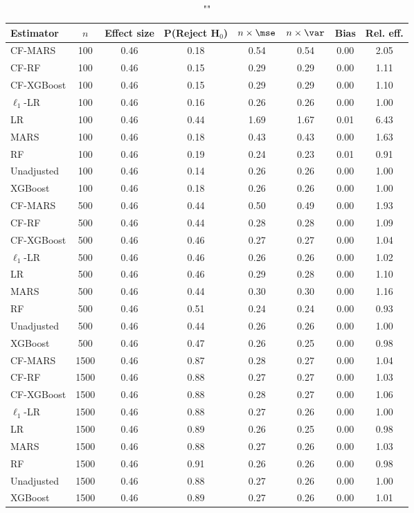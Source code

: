 \begin{table}
\centering
\caption{""}
\begin{tabular}{lccccccc}
\toprule
Estimator & $n$ & Effect size & P(Reject H$_0$) & $n\times\mse$ & $n\times \var$ & Bias & Rel. eff.\\ \midrule
CF-MARS & 100 & 0.46 & 0.18 & 0.54 & 0.54 & 0.00 & 2.05 \\ 
CF-RF & 100 & 0.46 & 0.15 & 0.29 & 0.29 & 0.00 & 1.11 \\ 
CF-XGBoost & 100 & 0.46 & 0.15 & 0.29 & 0.29 & 0.00 & 1.10 \\ 
$\ell_1$-LR & 100 & 0.46 & 0.16 & 0.26 & 0.26 & 0.00 & 1.00 \\ 
LR & 100 & 0.46 & 0.44 & 1.69 & 1.67 & 0.01 & 6.43 \\ 
MARS & 100 & 0.46 & 0.18 & 0.43 & 0.43 & 0.00 & 1.63 \\ 
RF & 100 & 0.46 & 0.19 & 0.24 & 0.23 & 0.01 & 0.91 \\ 
Unadjusted & 100 & 0.46 & 0.14 & 0.26 & 0.26 & 0.00 & 1.00 \\ 
XGBoost & 100 & 0.46 & 0.18 & 0.26 & 0.26 & 0.00 & 1.00 \\ \addlinespace 
CF-MARS & 500 & 0.46 & 0.44 & 0.50 & 0.49 & 0.00 & 1.93 \\ 
CF-RF & 500 & 0.46 & 0.44 & 0.28 & 0.28 & 0.00 & 1.09 \\ 
CF-XGBoost & 500 & 0.46 & 0.46 & 0.27 & 0.27 & 0.00 & 1.04 \\ 
$\ell_1$-LR & 500 & 0.46 & 0.46 & 0.26 & 0.26 & 0.00 & 1.02 \\ 
LR & 500 & 0.46 & 0.46 & 0.29 & 0.28 & 0.00 & 1.10 \\ 
MARS & 500 & 0.46 & 0.44 & 0.30 & 0.30 & 0.00 & 1.16 \\ 
RF & 500 & 0.46 & 0.51 & 0.24 & 0.24 & 0.00 & 0.93 \\ 
Unadjusted & 500 & 0.46 & 0.44 & 0.26 & 0.26 & 0.00 & 1.00 \\ 
XGBoost & 500 & 0.46 & 0.47 & 0.26 & 0.25 & 0.00 & 0.98 \\ \addlinespace 
CF-MARS & 1500 & 0.46 & 0.87 & 0.28 & 0.27 & 0.00 & 1.04 \\ 
CF-RF & 1500 & 0.46 & 0.88 & 0.27 & 0.27 & 0.00 & 1.03 \\ 
CF-XGBoost & 1500 & 0.46 & 0.88 & 0.28 & 0.27 & 0.00 & 1.06 \\ 
$\ell_1$-LR & 1500 & 0.46 & 0.88 & 0.27 & 0.26 & 0.00 & 1.00 \\ 
LR & 1500 & 0.46 & 0.89 & 0.26 & 0.25 & 0.00 & 0.98 \\ 
MARS & 1500 & 0.46 & 0.88 & 0.27 & 0.26 & 0.00 & 1.03 \\ 
RF & 1500 & 0.46 & 0.91 & 0.26 & 0.26 & 0.00 & 0.98 \\ 
Unadjusted & 1500 & 0.46 & 0.88 & 0.27 & 0.26 & 0.00 & 1.00 \\ 
XGBoost & 1500 & 0.46 & 0.89 & 0.27 & 0.26 & 0.00 & 1.01 \\
\bottomrule
\end{tabular}
\end{table}

